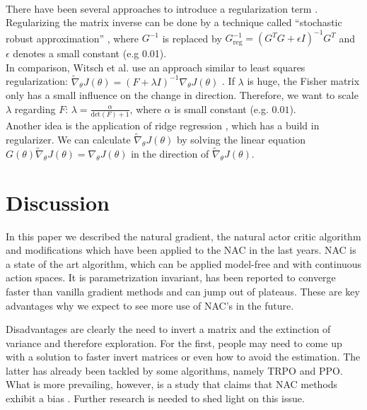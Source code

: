 \\
\indent There have been several approaches to introduce a regularization term \cite{sohl2012natural}. Regularizing the matrix inverse can be done by a technique called ``stochastic robust approximation'' \cite{boyd2004convex}, where $G^{-1}$ is replaced by \(G^{-1}_{\text{reg}} = \left( G^T G + \epsilon I \right)^{-1} G^T\) and $\epsilon$ denotes a small constant (e.g 0.01).
\\
\indent In comparison, Witsch et al. use an approach similar to least squares regularization: \( \widetilde{ \nabla }_{\theta} J(\theta) = \left( F + \lambda I \right)^{-1} \nabla_\theta J(\theta)\) \cite{witsch2011enhancing}. If $\lambda$ is huge, the Fisher matrix only has a small influence on the change in direction. Therefore, we want to scale $\lambda$ regarding $F$: \(\lambda = \tfrac{\alpha}{\text{det}(F) + 1}\), where $\alpha$ is small constant (e.g. $0.01$).
\\
\indent Another idea is the application of ridge regression \cite{hoerl1970ridge}, which has a build in regularizer. We can calculate $\widetilde{\nabla}_{\theta} J(\theta)$ by solving the linear equation \(G(\theta) \widetilde{\nabla}_{\theta} J(\theta) = \nabla_{\theta} J(\theta)\) in the direction of $\widetilde{\nabla}_{\theta} J(\theta)$.


\section{Discussion}
\label{sec:discussion}

In this paper we described the natural gradient, the natural actor critic algorithm and modifications which have been applied to the NAC in the last years. NAC is a state of the art algorithm, which can be applied model-free and with continuous action spaces. It is parametrization invariant, has been reported to converge faster than vanilla gradient methods and can jump out of plateaus. These are key advantages why we expect to see more use of NAC's in the future. 

Disadvantages are clearly the need to invert a matrix and the extinction of variance and therefore exploration. For the first, people may need to come up with a solution to faster invert matrices or even how to avoid the estimation. The latter has already been tackled by some algorithms, namely TRPO and PPO. What is more prevailing, however, is a study that claims that NAC methods exhibit a bias \cite{thomas2014bias}. Further research is needed to shed light on this issue.

